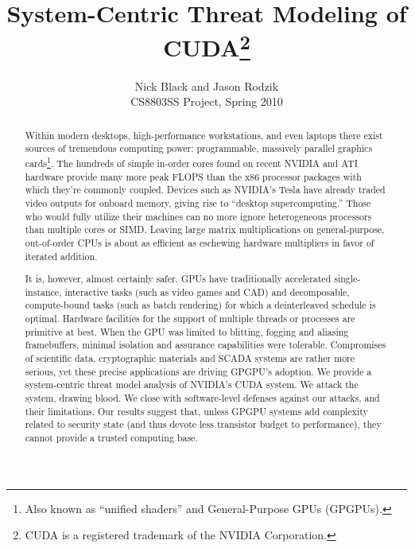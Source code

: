 \documentclass[letterpaper,10pt]{article}
\title{System-Centric Threat Modeling of CUDA\footnote{CUDA\textsuperscript{\textregistered}
is a registered trademark of the NVIDIA Corporation.}}
\author{Nick Black and Jason Rodzik\\
CS8803SS Project, Spring 2010}
\date{}
\begin{document}
\maketitle

\begin{abstract}
Within modern desktops, high-performance workstations, and even laptops there
exist sources of tremendous computing power: programmable, massively parallel graphics cards\footnote{Also known as ``unified shaders'' and General-Purpose GPUs (GPGPUs).}.
The hundreds of simple in-order cores found on recent NVIDIA and ATI hardware provide many more peak FLOPS than the x86 processor packages with
which they're commonly coupled.
Devices such as NVIDIA's Tesla\texttrademark{} have already traded video outputs for onboard memory, giving rise to ``desktop
supercomputing.'' Those who would fully utilize their machines can
no more ignore heterogeneous processors than multiple cores or SIMD\@. Leaving
large matrix multiplications on general-purpose, out-of-order CPUs is about as
efficient as eschewing hardware multipliers in favor of iterated addition.

It is, however, almost certainly safer. GPUs have traditionally accelerated
single-instance, interactive tasks (such as video games and CAD) and
decomposable, compute-bound tasks (such as batch rendering) for which a
deinterleaved schedule is optimal. Hardware facilities for the support of
multiple threads or processes are primitive at best. When the GPU was limited to
blitting, fogging and aliasing framebuffers, minimal isolation and
assurance capabilities were tolerable. Compromises of scientific data,
cryptographic materials and SCADA systems are rather more serious, yet these
precise applications are driving GPGPU's adoption. We provide a system-centric threat
model analysis of NVIDIA's CUDA system. We attack the system, drawing blood.
We close with software-level defenses against our attacks, and their limitations.
Our results suggest that, unless GPGPU systems add complexity related to security state (and thus devote
less transistor budget to performance), they cannot provide a trusted computing
base.

\end{abstract}
\end{document}

